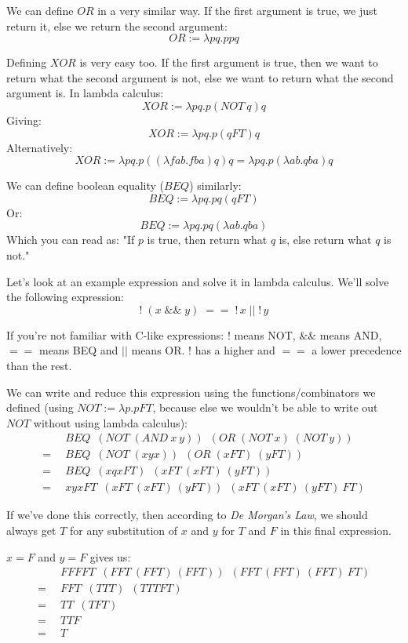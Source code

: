 \documentclass[11pt]{article}
\begin{document}
We can define \(OR\) in a very similar way. If the first argument is true, we
just return it, else we return the second argument:
\[OR:=\lambda pq.ppq\]

Defining \(XOR\) is very easy too. If the first argument is true, then we want
to return what the second argument is not, else we want to return what the
second argument is. In lambda calculus:
\[XOR:=\lambda pq.p(NOT\:q)q\]
Giving:
\[XOR:=\lambda pq.p(qFT)q\]
Alternatively:
\[XOR:=\lambda pq.p((\lambda fab.fba)q)q=\lambda pq.p(\lambda ab.qba)q\]

We can define boolean equality (\(BEQ\)) similarly:
\[BEQ:=\lambda pq.pq(qFT)\]
Or:
\[BEQ:=\lambda pq.pq(\lambda ab.qba)\]
Which you can read as: "If \(p\) is true, then return what \(q\) is, else
return what \(q\) is not."

Let's look at an example expression and solve it in lambda calculus. We'll
solve the following expression:
\[!\;(x\;\&\&\;y)\;==\;!\,x\;||\;!\,y\]

If you're not familiar with C-like expressions: \(!\) means NOT, \(\&\&\) means
AND, \(==\) means BEQ and \(||\) means OR. \(!\) has a higher and \(==\) a
lower precedence than the rest.

We can write and reduce this expression using the functions/combinators we
defined (using \(NOT:=\lambda p.pFT\), because else we wouldn't be able to
write out \(NOT\) without using lambda calculus):
\begin{align*}
	&\enspace BEQ\enspace
		(NOT\;(AND\:x\:y))\enspace
		(OR\;(NOT\:x)\;(NOT\:y))\\
	=&\enspace BEQ\enspace
		(NOT\;(xyx))\enspace
		(OR\;(xFT)\;(yFT))\\
	=&\enspace BEQ\enspace
		(xqxFT)\enspace
		(xFT\:(xFT)\:(yFT))\\
	=&\enspace xyxFT\enspace
		(xFT\:(xFT)\:(yFT))\enspace
		(xFT\:(xFT)\:(yFT)\:FT)
\end{align*}


If we've done this correctly, then according to \emph{De Morgan's Law}, we
should always get \(T\) for any substitution of \(x\) and \(y\) for \(T\) and
\(F\) in this final expression.

\(x=F\) and \(y=F\) gives us:
\begin{align*}
	&\enspace FFFFT\enspace
		(FFT\:(FFT)\:(FFT))\enspace
		(FFT\:(FFT)\:(FFT)\:FT)\\
	=&\enspace FFT\enspace(TTT)\enspace(TTTFT)\\
	=&\enspace TT\enspace(TFT)\\
	=&\enspace TTF\\
	=&\enspace T
\end{align*}
\end{document}
